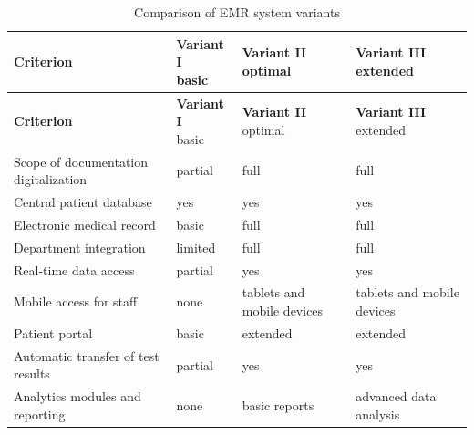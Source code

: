     \begin{longtable}{|p{4cm}|p{3cm}|p{3cm}|p{3cm}|}

    \caption{Comparison of EMR system variants}
    \label{tab:warianty_emr} \\

    \hline
    \textbf{Criterion} &
    \shortstack{\textbf{Variant I} \\ basic} &
    \shortstack{\textbf{Variant II} \\ optimal} &
    \shortstack{\textbf{Variant III} \\ extended} \\
    \hline
    \endfirsthead

    \hline
    \textbf{Criterion} &
    \shortstack{\textbf{Variant I} \\ basic} &
    \shortstack{\textbf{Variant II} \\ optimal} &
    \shortstack{\textbf{Variant III} \\ extended} \\
    \hline
    \endhead

    Scope of documentation digitalization &
    partial &
    full &
    full \\
    \hline

    Central patient database &
    yes &
    yes &
    yes \\
    \hline

    Electronic medical record &
    basic &
    full &
    full \\
    \hline

    Department integration &
    limited &
    full &
    full \\
    \hline

    Real-time data access &
    partial &
    yes &
    yes \\
    \hline

    Mobile access for staff &
    none &
    tablets and mobile devices &
    tablets and mobile devices \\
    \hline

    Patient portal &
    basic &
    extended &
    extended \\
    \hline

    Automatic transfer of test results &
    partial &
    yes &
    yes \\
    \hline

    Analytics modules and reporting &
    none &
    basic reports &
    advanced data analysis \\
    \hline


\end{longtable}
